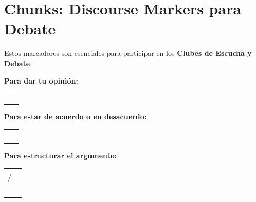 \documentclass[12pt,a4paper]{article}
\begin{document}
\section{Chunks: Discourse Markers para Debate}

\begin{cajachunk}
Estos marcadores son esenciales para participar en los \textbf{Clubes de Escucha y Debate}.

\medskip
\textbf{Para dar tu opinión:}
\begin{tabularx}{\textwidth}{@{} X l @{}}
\eng{I think / believe that...} & \esp{Creo que...} \\
\eng{In my opinion, ...} & \esp{En mi opinión, ...} \\
\eng{From my point of view, ...} & \esp{Desde mi punto de vista, ...} \\
\eng{As far as I'm concerned, ...} & \esp{En lo que a mí respecta, ...} \\
\end{tabularx}

\medskip
\textbf{Para estar de acuerdo o en desacuerdo:}
\begin{tabularx}{\textwidth}{@{} X l @{}}
\eng{I agree with you.} & \esp{Estoy de acuerdo contigo.} \\
\eng{I agree because...} & \esp{Estoy de acuerdo porque...} \\
\eng{I see your point, but...} & \esp{Entiendo tu punto, pero...} \\
\eng{I'm not sure about that.} & \esp{No estoy seguro de eso.} \\
\eng{I disagree because...} & \esp{No estoy de acuerdo porque...} \\
\end{tabularx}

\medskip
\textbf{Para estructurar el argumento:}
\begin{tabularx}{\textwidth}{@{} X l @{}}
\eng{First of all, ...} & \esp{En primer lugar, ...} \\
\eng{Moreover, ...} / \eng{Furthermore, ...} & \esp{Además, ...} \\
\eng{However, ...} & \esp{Sin embargo, ...} \\
\eng{Although...} & \esp{Aunque...} \\
\eng{On the other hand, ...} & \esp{Por otro lado, ...} \\
\eng{In conclusion, ...} & \esp{En conclusión, ...} \\
\eng{To sum up, ...} & \esp{En resumen, ...} \\
\end{tabularx}
\end{cajachunk}
\end{document}
